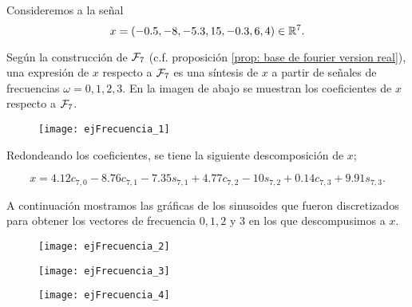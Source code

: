 \begin{ejemplo}
\label{ej: DFT1}
Consideremos a la señal 
\begin{equation}
\label{eq2: 10ab}
x=(-0.5,-8,-5.3,15,-0.3,6,4) \in \mathbb{R}^{7}.
\end{equation}

Según la construcción de $\mathcal{F}_{7}$ (c.f. 
proposición \ref{prop: base de fourier version real}),
una expresión de $x$ respecto a $\mathcal{F}_{7}$ 
es una síntesis de $x$ a partir de señales 
de frecuencias $\omega = 0,1,2,3$. En la imagen de abajo
se muestran los coeficientes de $x$ respecto a $\mathcal{F}_{7}$.

\begin{figure}[H]
	\centering
	\texttt{[image: ejFrecuencia\_1]} 
\end{figure}	

Redondeando los coeficientes, 
se tiene la siguiente descomposición de $x$;

\begin{equation}
\label{eq: analisis x TDF}
x = 4.12 c_{7,0} - 8.76c_{7,1} -7.35s_{7,1}+
4.77c_{7,2}-10s_{7,2}+0.14c_{7,3}+9.91s_{7,3}.
\end{equation}

\noindent
A continuación mostramos las gráficas
de los sinusoides que fueron discretizados
para obtener los vectores de frecuencia
$0,1,2$ y $3$ en los que descompusimos a $x$.

\begin{figure}[H]
	\centering
	\texttt{[image: ejFrecuencia\_2]} 
\end{figure}	

\begin{figure}[H]
	\centering
	\texttt{[image: ejFrecuencia\_3]} 
\end{figure}	

\begin{figure}[H]
	\centering
	\texttt{[image: ejFrecuencia\_4]} 
\end{figure}	



\end{ejemplo}
